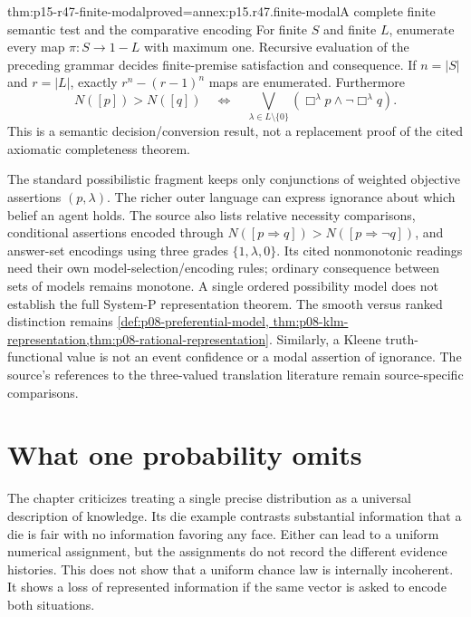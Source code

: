 \begin{hbtheorem}{thm:p15-r47-finite-modal}{proved=annex:p15.r47.finite-modal}{A complete finite semantic test and the comparative encoding}
For finite \(S\) and finite \(L\), enumerate every map
\(\pi:S\to1-L\) with maximum one. Recursive evaluation of the preceding
grammar decides finite-premise satisfaction and consequence. If
\(n=|S|\) and \(r=|L|\), exactly \(r^n-(r-1)^n\) maps are enumerated.
Furthermore
\[
 N([p])>N([q])
 \quad\Longleftrightarrow\quad
 \bigvee_{\lambda\in L\setminus\{0\}}
       (\Box^\lambda p\land\neg\Box^\lambda q).
\]
This is a semantic decision/conversion result, not a replacement proof of
the cited axiomatic completeness theorem.
\end{hbtheorem}

The standard possibilistic fragment keeps only conjunctions of weighted
objective assertions \((p,\lambda)\). The richer outer language can express
ignorance about which belief an agent holds. The source also lists relative
necessity comparisons, conditional assertions encoded through
\(N([p\Rightarrow q])>N([p\Rightarrow\neg q])\), and answer-set encodings
using three grades \(\{1,\lambda,0\}\). Its cited nonmonotonic readings
need their own model-selection/encoding rules; ordinary consequence between
sets of models remains monotone. A single ordered possibility model does
not establish the full System-P representation theorem. The smooth versus
ranked distinction remains \cref{def:p08-preferential-model,
thm:p08-klm-representation,thm:p08-rational-representation}.
Similarly, a Kleene truth-functional value is not an event confidence or
a modal assertion of ignorance. The source's references to the three-valued
translation literature remain source-specific comparisons.

\section{What one probability omits}

The chapter criticizes treating a single precise distribution as a universal
description of knowledge. Its die example contrasts substantial information
that a die is fair with no information favoring any face. Either can lead
to a uniform numerical assignment, but the assignments do not record the
different evidence histories. This does not show that a uniform chance law
is internally incoherent. It shows a loss of represented information if
the same vector is asked to encode both situations.

